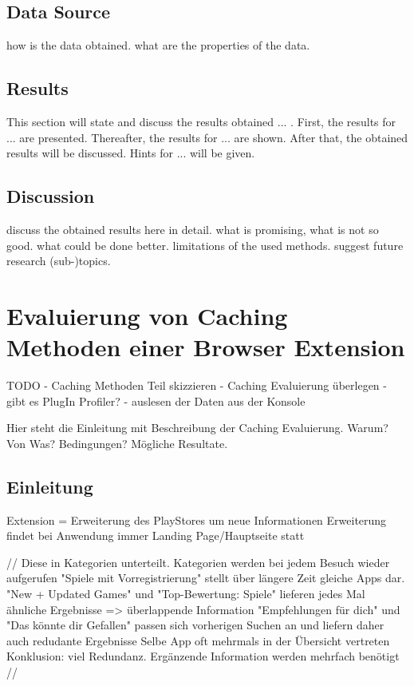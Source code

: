 \subsection{Data Source}
\label{ss:datasource}

how is the data obtained. what are the properties of the data.


\subsection{Results}
\label{ss:results}

This section will state and discuss the results obtained ... . First, the results for ... are presented. Thereafter, the results for ... are shown. After that, the obtained results will be discussed. Hints for ... will be given.




\subsection{Discussion}
\label{ss:discussion_details}

discuss the obtained results here in detail. what is promising, what is not so good. what could be done better. limitations of the used methods. suggest future research (sub-)topics.







\section{Evaluierung von Caching Methoden einer Browser Extension}
\label{s:solution_prob_2}

TODO
- Caching Methoden Teil skizzieren
- Caching Evaluierung überlegen
- gibt es PlugIn Profiler?
- auslesen der Daten aus der Konsole

Hier steht die Einleitung mit Beschreibung der Caching Evaluierung. Warum? Von Was? Bedingungen? Mögliche Resultate.


\subsection{Einleitung}
Extension = Erweiterung des PlayStores um neue Informationen
Erweiterung findet bei Anwendung immer Landing Page/Hauptseite statt

//
Diese in Kategorien unterteilt. Kategorien werden bei jedem Besuch wieder aufgerufen
"Spiele mit Vorregistrierung" stellt über längere Zeit gleiche Apps dar.
"New + Updated Games" und "Top-Bewertung: Spiele" lieferen jedes Mal ähnliche Ergebnisse => überlappende Information
"Empfehlungen für dich" und "Das könnte dir Gefallen" passen sich vorherigen Suchen an und liefern daher auch redudante Ergebnisse
Selbe App oft mehrmals in der Übersicht vertreten
Konklusion: viel Redundanz. Ergänzende Information werden mehrfach benötigt
//

